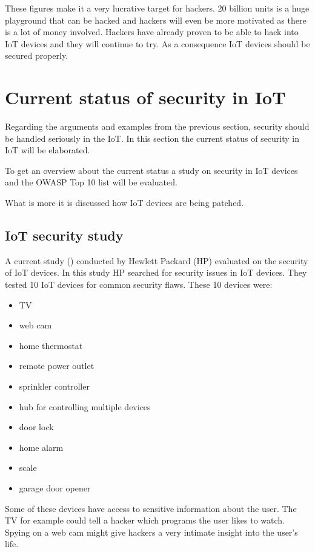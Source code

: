 \documentclass[conference]{IEEEtran}
\begin{document}
These figures make it a very lucrative target for hackers. 20 billion units is 
a huge playground that can be hacked and hackers will even be more motivated as 
there is a lot of money involved. Hackers have already proven to be able to 
hack into IoT devices and they will continue to try. As a consequence IoT 
devices should be secured properly.

\section{Current status of security in IoT}
Regarding the arguments and examples from the previous section, security should 
be handled seriously in the IoT. In this section the current status of security 
in IoT will be elaborated. 

To get an overview about the current status a study on security in IoT devices 
and the OWASP Top 10 list will be evaluated. 

What is more it is discussed how IoT devices are being patched.

\subsection{IoT security study}
A current study (\cite{HPstudy}) conducted by Hewlett Packard (HP) evaluated on 
the security of IoT devices. In this study HP searched for security issues in 
IoT devices. They tested 10 IoT devices for common security flaws. These 10 
devices were:

\begin{itemize}
\item TV
\item web cam
\item home thermostat
\item remote power outlet
\item sprinkler controller
\item hub for controlling multiple devices
\item door lock
\item home alarm
\item scale
\item garage door opener
\end{itemize}

Some of these devices have access to sensitive information about the user. The 
TV for example could tell a hacker which programs the user likes to watch. 
Spying on a web cam might give hackers a very intimate insight into the user's 
life.
\end{document}
